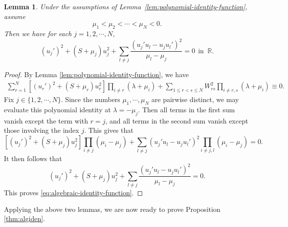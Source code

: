 \documentclass[11pt]{article}
\numberwithin{equation}{section}
\newtheorem{lemma}[theorem]{Lemma}
\theoremstyle{definition}
\begin{document}
\begin{lemma}\label{lem:algebraic-identity-function}
Under the assumptions of Lemma~\ref{lem:polynomial-identity-function},  assume
\[
\mu_1<\mu_2<\cdots<\mu_N<0.
\]
Then we have for each \(j=1,2,\cdots,N\),
\begin{equation}\label{eq:algebraic-identity-function}
	(u_j')^2+(S+\mu_j)u_j^2
	+
	\sum_{l\neq j}
	\frac{(u_j'u_l-u_ju_l')^2}{\mu_l-\mu_j}
	=0
	\ \ \text{in }\ \mathbb R.
\end{equation}
\end{lemma}



\begin{proof}
By Lemma \ref{lem:polynomial-identity-function}, we have
\[
\begin{split}
	\sum_{r=1}^N
	\left[
	(u_r')^2+(S+\mu_r)u_r^2
	\right]
	\prod_{i\neq r}(\lambda+\mu_i)
	+
	\sum_{1\leq r<s\leq N}
	W_{rs}^2
	\prod_{i\neq r,s}(\lambda+\mu_i)
	\equiv0 .
\end{split}
\]
Fix \(j\in\{1,2,\cdots,N\}\). Since the numbers
\(\mu_1,\cdots,\mu_N\) are pairwise distinct, we may evaluate this
polynomial identity at \(\lambda=-\mu_j\). Then all terms in the
first sum vanish except the term with \(r=j\), and all terms in the
second sum vanish except those involving the index \(j\). This gives that
\[
\left[
(u_j')^2+(S+\mu_j)u_j^2
\right]
\prod_{i\neq j}(\mu_i-\mu_j)
+
\sum_{l\neq j}
(u_j'u_l-u_ju_l')^2
\prod_{i\neq j,l}(\mu_i-\mu_j)
=0.
\]
It then follows that
\[
(u_j')^2+(S+\mu_j)u_j^2
+
\sum_{l\neq j}
\frac{(u_j'u_l-u_ju_l')^2}{\mu_l-\mu_j}
=0.
\]
This proves \eqref{eq:algebraic-identity-function}.
\end{proof}

Applying the above two lemmas, we are now ready to prove Proposition \ref{thm:algiden}.
\end{document}
